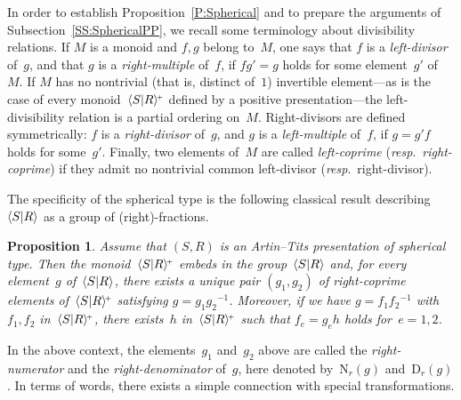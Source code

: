\documentclass{amsart}
\numberwithin{equation}{section}
\theoremstyle{plain}
\newtheorem{prop}{Proposition}[section]
\theoremstyle{definition}
\begin{document}
In order to establish Proposition~\ref{P:Spherical} and to prepare the arguments of Subsection~\ref{SS:SphericalPP}, we recall some terminology about divisibility relations. If ${M}$ is a monoid and ${f}, {g}$ belong to~${M}$, one says that ${f}$ is a \emph{left-divisor} of~${g}$, and that ${g}$ is a \emph{right-multiple} of~${f}$, if ${f} {g}' = {g}$ holds for some element~${g}'$ of~${M}$. If ${M}$ has no nontrivial (that is, distinct of~$1$) invertible element---as is the case of every monoid~${\langle{S}{\mid}\nobreak{R}\rangle^{\!\scriptscriptstyle+}}$ defined by a positive presentation---the left-divisibility relation is a partial ordering on~${M}$. Right-divisors are defined symmetrically: ${f}$ is a \emph{right-divisor} of~${g}$, and ${g}$ is a \emph{left-multiple} of~${f}$, if ${g} = {g}' {f}$ holds for some~${g}'$. Finally, two elements of~${M}$ are called \emph{left-coprime} ({{\it resp}}.\ \emph{right-coprime}) if they admit no nontrivial common left-divisor ({{\it resp}}.\ right-divisor). 

The specificity of the spherical type is the following classical result describing~${\langle{S}{\mid}\nobreak{R}\rangle}$ as a group of (right)-fractions.

\begin{prop}\cite{BrS, Eps, Tat, Chb}
\label{P:Fraction}
Assume that $({S}, {R})$ is an Artin--Tits presentation of spherical type. Then the monoid~${\langle{S}{\mid}\nobreak{R}\rangle^{\!\scriptscriptstyle+}}$ embeds in the group~${\langle{S}{\mid}\nobreak{R}\rangle}$ and, for every element~${g}$ of~${\langle{S}{\mid}\nobreak{R}\rangle}$, there exists a unique pair $({g}_1, {g}_2)$ of right-coprime elements of~${\langle{S}{\mid}\nobreak{R}\rangle^{\!\scriptscriptstyle+}}$ satisfying ${g} = {g}_1 {g}_2{^{-1}} $. Moreover, if we have ${g} = {f}_1 {f}_2{^{-1}}$ with ${f}_1, {f}_2$ in~${\langle{S}{\mid}\nobreak{R}\rangle^{\!\scriptscriptstyle+}}$, there exists~${h}$ in~${\langle{S}{\mid}\nobreak{R}\rangle^{\!\scriptscriptstyle+}}$ such that ${f}_{e} = {g}_{e} {h}$ holds for~${e} = 1,2$.
\end{prop}

In the above context, the elements~${g}_1$ and~${g}_2$ above are called the \emph{right-numerator} and the \emph{right-denomin\-ator} of~${g}$, here denoted by~${{\scriptstyle\mathrm{N}}{_{r}}({g})}$ and~${{\scriptstyle\mathrm{D}}{_{r}}({g})}$. In terms of words, there exists a simple connection with special transformations.
\end{document}
